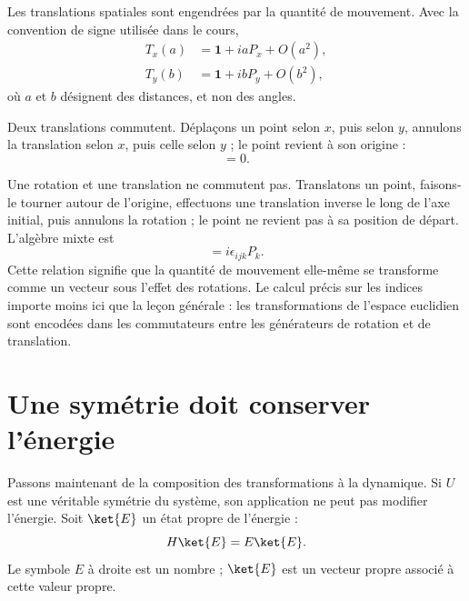 Les translations spatiales sont engendrées par la quantité de mouvement. Avec la convention de signe utilisée dans le cours,
\begin{equation}
\begin{aligned}
T_x(a)&=\mathbf 1+iaP_x+O(a^2),\\
T_y(b)&=\mathbf 1+ibP_y+O(b^2),
\end{aligned}
\end{equation}
où \(a\) et \(b\) désignent des distances, et non des angles.

Deux translations commutent. Déplaçons un point selon \(x\), puis selon \(y\), annulons la translation selon \(x\), puis celle selon \(y\) ; le point revient à son origine :
\begin{equation}
[P_i,P_j]=0.
\end{equation}

\begin{classroomqa}
\end{classroomqa}

Une rotation et une translation ne commutent pas. Translatons un point, faisons-le tourner autour de l’origine, effectuons une translation inverse le long de l’axe initial, puis annulons la rotation ; le point ne revient pas à sa position de départ. L’algèbre mixte est
\begin{equation}
[L_i,P_j]=i\epsilon_{ijk}P_k.
\end{equation}
Cette relation signifie que la quantité de mouvement elle-même se transforme comme un vecteur sous l’effet des rotations. Le calcul précis sur les indices importe moins ici que la leçon générale : les transformations de l’espace euclidien sont encodées dans les commutateurs entre les générateurs de rotation et de translation.

\section{Une symétrie doit conserver l’énergie}

Passons maintenant de la composition des transformations à la dynamique. Si \(U\) est une véritable symétrie du système, son application ne peut pas modifier l’énergie. Soit \(\ket{E}\) un état propre de l’énergie :
\begin{equation}
H\ket{E}=E\ket{E}.
\end{equation}
Le symbole \(E\) à droite est un nombre ; \(\ket{E}\) est un vecteur propre associé à cette valeur propre.

